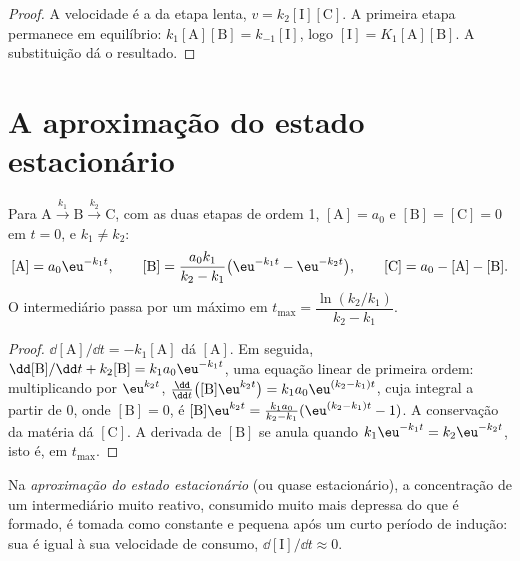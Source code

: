 \begin{proof}
A velocidade é a da etapa lenta, $v = k_2[\mathrm{I}][\mathrm{C}]$. A
primeira etapa permanece em equilíbrio: $k_1[\mathrm{A}][\mathrm{B}] =
k_{-1}[\mathrm{I}]$, logo $[\mathrm{I}] = K_1[\mathrm{A}][\mathrm{B}]$.
A substituição dá o resultado.
\end{proof}

\section{A aproximação do estado estacionário}

\begin{theorem}\label{thm:b1:elementary-steps:consecutive}
Para $\mathrm{A} \xrightarrow{k_1} \mathrm{B} \xrightarrow{k_2} \mathrm{C}$,
com as duas etapas de ordem 1, $[\mathrm{A}] = a_0$ e $[\mathrm{B}] =
[\mathrm{C}] = 0$ em $t = 0$, e $k_1 \ne k_2$:
\[
  [\mathrm{A}] = a_0\eu^{-k_1t}, \qquad
  [\mathrm{B}] = \frac{a_0k_1}{k_2 - k_1}\big(\eu^{-k_1t} - \eu^{-k_2t}\big),
  \qquad [\mathrm{C}] = a_0 - [\mathrm{A}] - [\mathrm{B}] .
\]
O intermediário passa por um máximo em $t_{\max} = \dfrac{\ln(k_2/k_1)}
{k_2 - k_1}$.
\end{theorem}

\begin{proof}
$\dd[\mathrm{A}]/\dd t = -k_1[\mathrm{A}]$ dá $[\mathrm{A}]$. Em seguida,
$\dd[\mathrm{B}]/\dd t + k_2[\mathrm{B}] = k_1a_0\eu^{-k_1t}$, uma equação
linear de primeira ordem: multiplicando por $\eu^{k_2t}$, $\frac{\dd}{\dd t}
\big([\mathrm{B}]\eu^{k_2t}\big) = k_1a_0\eu^{(k_2-k_1)t}$, cuja
integral a partir de 0, onde $[\mathrm{B}] = 0$, é $[\mathrm{B}]\eu^{k_2t} =
\frac{k_1a_0}{k_2-k_1}(\eu^{(k_2-k_1)t} - 1)$. A conservação da matéria
dá $[\mathrm{C}]$. A derivada de $[\mathrm{B}]$ se anula quando $k_1\eu^{-k_1t}
= k_2\eu^{-k_2t}$, isto é, em $t_{\max}$.
\end{proof}

\begin{definition}\label{def:b1:elementary-steps:qssa}
Na \emph{aproximação do estado estacionário}
(ou quase estacionário), a concentração de um intermediário muito
reativo, consumido muito mais depressa do que é formado, é tomada como
constante e pequena após um curto período de indução: sua  é igual à sua velocidade de consumo,
$\dd[\mathrm{I}]/\dd t \approx 0$.
\end{definition}

